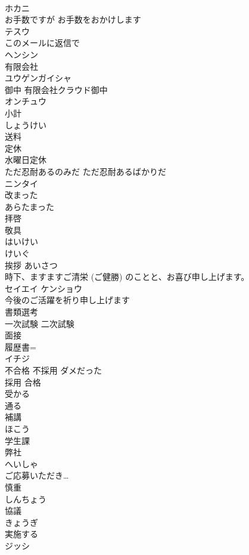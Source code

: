 \documentclass[8pt]{extreport}
\begin{document}
\begin{CJK}{UTF8}{min}
\\	ホカニ
\\	お手数ですが お手数をおかけします	
\\	テスウ
\\	このメールに返信で	
\\	ヘンシン
\\	有限会社	
\\	ユウゲンガイシャ
\\	御中 有限会社クラウド御中	
\\	オンチュウ
\\	小計	
\\	しょうけい
\\	送料	
\\	定休 
\\	水曜日定休	
\\	ただ忍耐あるのみだ ただ忍耐あるばかりだ	
\\	ニンタイ
\\	改まった	
\\	あらたまった
\\	拝啓 
\\	敬具	
\\	はいけい 
\\	けいぐ
\\	挨拶	あいさつ
\\	時下、ますますご清栄 (ご健勝) のことと、お喜び申し上げます。	
\\	セイエイ ケンショウ
\\	今後のご活躍を祈り申し上げます	
\\	書類選考	
\\	一次試験 二次試験	
\\	面接 
\\	履歴書=
\\	イチジ
\\	不合格 不採用	ダメだった 
\\	採用 合格	
\\	受かる	
\\	通る	
\\	補講	
\\	ほこう
\\	学生課	
\\	弊社	
\\	へいしゃ
\\	ご応募いただき…	
\\	慎重	
\\	しんちょう
\\	協議	
\\	きょうぎ
\\	実施する	
\\	ジッシ

\end{CJK}
\end{document}
